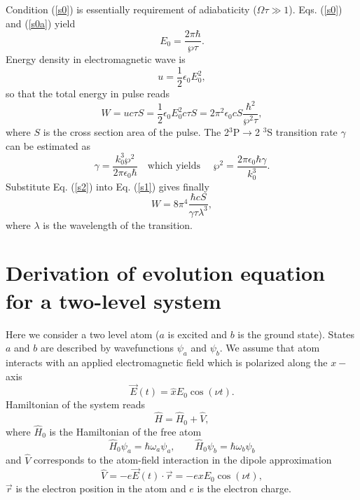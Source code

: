 \documentclass[preprint,preprintnumbers]{revtex4}
\begin{document}
Condition (\ref{s0}) is essentially requirement of adiabaticity ($\Omega
\tau \gg 1$). Eqs. (\ref{s0}) and (\ref{s0a}) yield%
\begin{equation}
E_{0}=\frac{2\pi \hbar }{\wp \tau }.
\end{equation}%
Energy density in electromagnetic wave is
\begin{equation}
u=\frac{1}{2}\epsilon _{0}E_{0}^{2},
\end{equation}%
so that the total energy in pulse reads%
\begin{equation}
W=uc\tau S=\frac{1}{2}\epsilon _{0}E_{0}^{2}c\tau S=2\pi ^{2}\epsilon _{0}cS%
\frac{\hbar ^{2}}{\wp ^{2}\tau },  \label{s1}
\end{equation}%
where $S$ is the cross section area of the pulse. The 2$^{3}$P$\rightarrow $2%
$^{3}$S transition rate $\gamma $ can be estimated as%
\begin{equation}
\gamma =\frac{k_{0}^{3}\wp ^{2}}{2\pi \epsilon _{0}\hbar }\quad \text{which
yields }\quad \wp ^{2}=\frac{2\pi \epsilon _{0}\hbar \gamma }{k_{0}^{3}}.
\label{s2}
\end{equation}%
Substitute Eq. (\ref{s2}) into Eq. (\ref{s1}) gives finally%
\begin{equation}
W=8\pi ^{4}\frac{\hbar cS}{\gamma \tau \lambda ^{3}},  \label{s3}
\end{equation}%
where $\lambda $ is the wavelength of the transition.

\section{Derivation of evolution equation for a two-level system}

Here we consider a two level atom ($a$ is excited and $b$ is the ground
state). States $a$ and $b$ are described by wavefunctions $\psi _{a}$ and $%
\psi _{b}$. We assume that atom interacts with an applied electromagnetic
field which is polarized along the $x-$ axis%
\begin{equation}
\vec{E}(t)=\hat{x}E_{0}\cos (\nu t).
\end{equation}%
Hamiltonian of the system reads
\begin{equation}
\hat{H}=\hat{H}_{0}+\hat{V},
\end{equation}%
where $\hat{H}_{0}$ is the Hamiltonian of the free atom%
\begin{equation}
\hat{H}_{0}\psi _{a}=\hbar \omega _{a}\psi _{a},\qquad \hat{H}_{0}\psi
_{b}=\hbar \omega _{b}\psi _{b}
\end{equation}%
and $\hat{V}$ corresponds to the atom-field interaction in the dipole
approximation%
\begin{equation}
\hat{V}=-e\vec{E}(t)\cdot \vec{r}=-exE_{0}\cos (\nu t),
\end{equation}%
$\vec{r}$ is the electron position in the atom and $e$ is the electron
charge.
\end{document}
